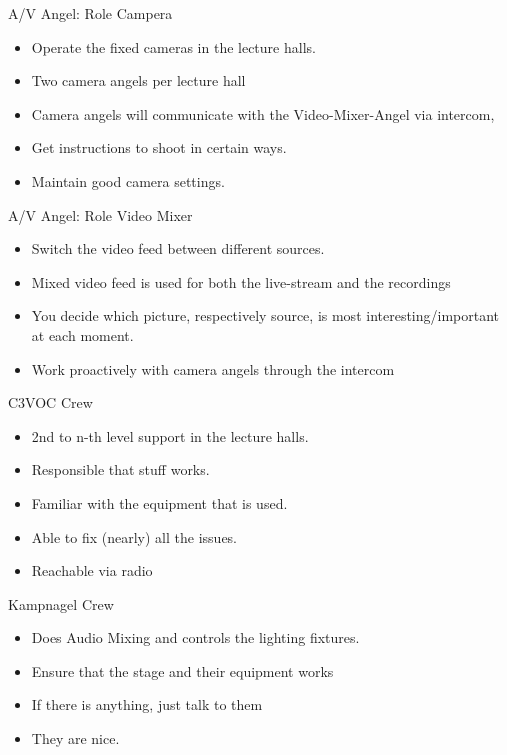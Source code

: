 \documentclass[aspectratio=169]{beamer}
\begin{document}
\begin{frame}{A/V Angel: Role Campera}
	\begin{itemize}
		\item Operate the fixed cameras in the lecture halls. 
		\item Two camera angels per lecture hall 
		\item Camera angels will communicate with the Video-Mixer-Angel via intercom,
		\item Get instructions to shoot in certain ways. 
		\item Maintain good camera settings.
	\end{itemize}
\end{frame}

\begin{frame}{A/V Angel: Role Video Mixer}
	\begin{itemize}
		\item Switch the video feed between different sources. 
		\item Mixed video feed is used for both the live-stream and the recordings 
		\item You decide which picture, respectively source, is most interesting/important at each moment.
		\item Work proactively with camera angels through the intercom
	\end{itemize}
\end{frame}



\begin{frame}{C3VOC Crew}
	\begin{itemize}
		\item 2nd to n-th level support in the lecture halls. 
		\item Responsible that stuff works.
		\item Familiar with the equipment that is used. 
		\item Able to fix (nearly) all the issues. 
		\item Reachable via radio
	\end{itemize}
\end{frame}

\begin{frame}{Kampnagel Crew}
	\begin{itemize}
		\item Does Audio Mixing and controls the lighting fixtures.
		\item Ensure that the stage and their equipment works
		\item If there is anything, just talk to them
		\item They are nice.
	\end{itemize}
\end{frame}
\end{document}
